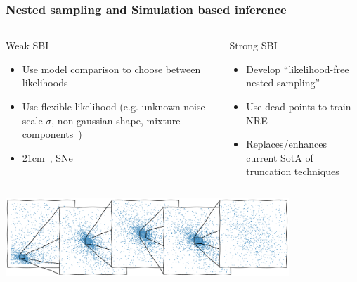 \documentclass[aspectratio=169]{beamer}
\begin{document}
\begin{frame}
    \frametitle{Nested sampling and Simulation based inference}
    \begin{columns}[t]
        \begin{block}{Weak SBI}
            \begin{itemize}
                \item Use model comparison to choose between likelihoods
                \item Use flexible likelihood (e.g. unknown noise scale $\sigma$, non-gaussian shape, mixture components~)
                \item 21cm~, SNe~
            \end{itemize}

        \end{block}
        \begin{block}{Strong SBI}
            \begin{itemize}
                \item Develop ``likelihood-free nested sampling''
                \item Use dead points to train NRE
                \item Replaces/enhances current SotA of truncation techniques
            \end{itemize}
        \end{block}
    \end{columns}
    \centerline{
        \includegraphics[width=0.8\textwidth]{figures/dead_measure}
    }
\end{frame}
\end{document}
